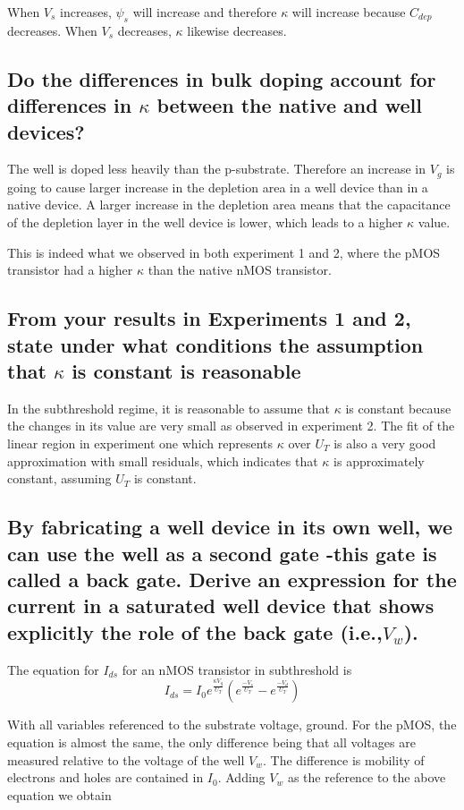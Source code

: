 When \(V_s\) increases, \(\psi_s\) will increase and therefore \(\kappa\) will increase because \(C_{dep}\) decreases.
When \(V_s\) decreases, \(\kappa\) likewise decreases.

\subsection{Do the differences in bulk doping account for differences in \(\kappa\) between the native and well devices?}
The well is doped less heavily than the p-substrate. Therefore an increase in \(V_g\) is going to cause larger increase
in the depletion area in a well device than in a native device. A larger increase in the depletion area means that the
capacitance of the depletion layer in the well device is lower, which leads to a higher \(\kappa\) value.

This is indeed what we observed in both experiment 1 and 2, where the pMOS transistor had a higher \(\kappa\) than the 
native nMOS transistor.

\subsection{From your results in Experiments 1 and 2, state under what conditions the assumption that \(\kappa\) 
is constant is reasonable}
In the subthreshold regime, it is reasonable to assume that \(\kappa\) is constant because the changes in its value
are very small as observed in experiment 2. The fit of the linear region in experiment one which represents \(\kappa\) 
over \(U_T\) is also a very good approximation with small residuals, which indicates that \(\kappa\) is approximately 
constant, assuming \(U_T\) is constant.

\subsection{By fabricating a well device in its own well, we can use the well as a second gate -this gate is called a back gate. 
Derive an expression for the current in a saturated well device that shows explicitly the role of the back gate (i.e.,\(V_w\)).}

The equation for \(I_{ds}\) for an nMOS transistor in subthreshold is 
\begin{equation*}
    I_{ds} = I_0e^{\frac{\kappa V_g}{U_T}}\left(e^{\frac{-V_s}{U_T}}-e^{\frac{-V_d}{U_T}}\right)
\end{equation*}

With all variables referenced to the substrate voltage, ground. For the pMOS, the equation is almost the same, the
only difference being that all voltages are measured relative to the voltage of the well \(V_w\). 
The difference is mobility of electrons and holes are contained in \(I_0\). Adding \(V_w\) as the reference to the
above equation we obtain

